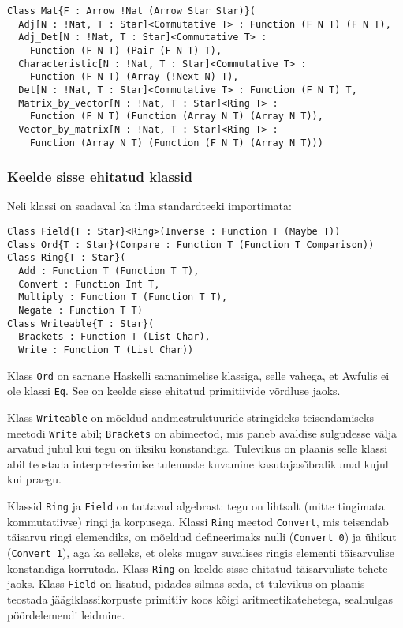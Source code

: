\documentclass[12pt]{article}
\begin{document}
        \begin{verbatim}Class Mat{F : Arrow !Nat (Arrow Star Star)}(
  Adj[N : !Nat, T : Star]<Commutative T> : Function (F N T) (F N T),
  Adj_Det[N : !Nat, T : Star]<Commutative T> :
    Function (F N T) (Pair (F N T) T),
  Characteristic[N : !Nat, T : Star]<Commutative T> :
    Function (F N T) (Array (!Next N) T),
  Det[N : !Nat, T : Star]<Commutative T> : Function (F N T) T,
  Matrix_by_vector[N : !Nat, T : Star]<Ring T> :
    Function (F N T) (Function (Array N T) (Array N T)),
  Vector_by_matrix[N : !Nat, T : Star]<Ring T> :
    Function (Array N T) (Function (F N T) (Array N T)))\end{verbatim}
      \subsubsection{Keelde sisse ehitatud klassid}
        Neli klassi on saadaval ka ilma standardteeki importimata:

        \begin{verbatim}Class Field{T : Star}<Ring>(Inverse : Function T (Maybe T))
Class Ord{T : Star}(Compare : Function T (Function T Comparison))
Class Ring{T : Star}(
  Add : Function T (Function T T),
  Convert : Function Int T,
  Multiply : Function T (Function T T),
  Negate : Function T T)
Class Writeable{T : Star}(
  Brackets : Function T (List Char),
  Write : Function T (List Char))\end{verbatim}

        Klass \verb!Ord! on sarnane Haskelli samanimelise klassiga, selle vahega, et Awfulis ei ole klassi \verb!Eq!. See on keelde sisse ehitatud primitiivide võrdluse jaoks.

        Klass \verb!Writeable! on mõeldud andmestruktuuride stringideks teisendamiseks meetodi \verb!Write! abil; \verb!Brackets! on abimeetod, mis paneb avaldise sulgudesse välja arvatud juhul kui tegu on üksiku konstandiga. Tulevikus on plaanis selle klassi abil teostada interpreteerimise tulemuste kuvamine kasutajasõbralikumal kujul kui praegu.

        Klassid \verb!Ring! ja \verb!Field! on tuttavad algebrast: tegu on lihtsalt (mitte tingimata kommutatiivse) ringi ja korpusega. Klassi \verb!Ring! meetod \verb!Convert!, mis teisendab täisarvu ringi elemendiks, on mõeldud defineerimaks nulli (\verb!Convert 0!) ja ühikut (\verb!Convert 1!), aga ka selleks, et oleks mugav suvalises ringis elementi täisarvulise konstandiga korrutada. Klass \verb!Ring! on keelde sisse ehitatud täisarvuliste tehete jaoks. Klass \verb!Field! on lisatud, pidades silmas seda, et tulevikus on plaanis teostada jäägiklassikorpuste primitiiv koos kõigi aritmeetikatehetega, sealhulgas pöördelemendi leidmine.
\end{document}
